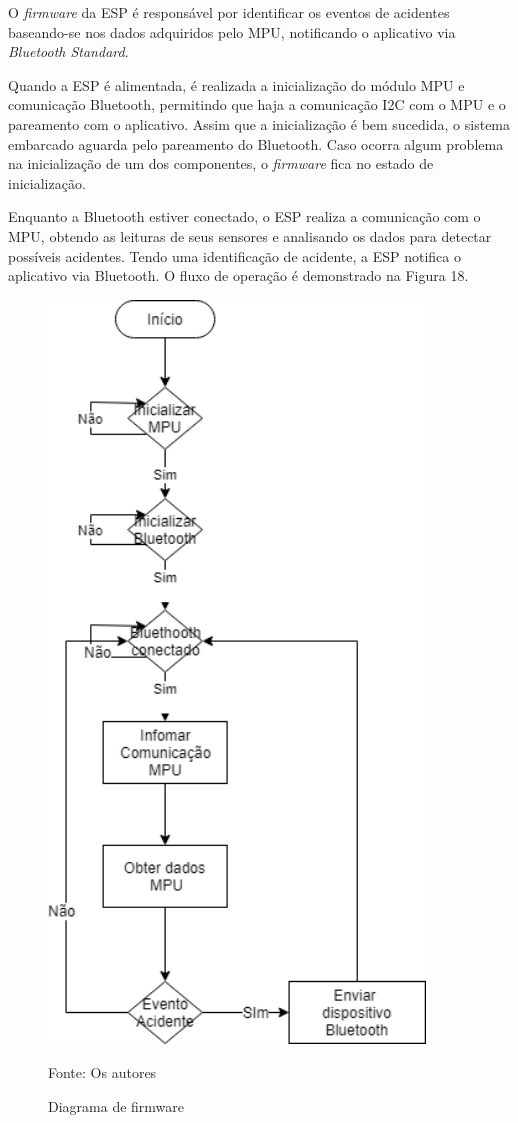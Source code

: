 O \textit{firmware} da ESP é responsável por identificar os eventos de acidentes baseando-se nos dados adquiridos pelo MPU, notificando o aplicativo via \textit{Bluetooth Standard}.

Quando a ESP é alimentada, é realizada a inicialização do módulo MPU e comunicação Bluetooth, permitindo que haja a comunicação I2C com o MPU e o pareamento com o aplicativo. Assim que a inicialização é bem sucedida, o sistema embarcado aguarda pelo pareamento do Bluetooth. Caso ocorra algum problema na inicialização de um dos componentes, o \textit{firmware} fica no estado de inicialização.

Enquanto a Bluetooth estiver conectado, o ESP realiza a comunicação com o MPU, obtendo as leituras de seus sensores e analisando os dados para detectar possíveis acidentes. Tendo uma identificação de acidente, a ESP notifica o aplicativo via Bluetooth.
O fluxo de operação é demonstrado na Figura 18.  

\begin{figure}[H]

 \caption{Diagrama de firmware}
\begin{center}
  \includegraphics[width=100mm]{images/Cap3/diagrama_firmware.png}
  \end{center}
      Fonte: Os autores   
\end{figure}





